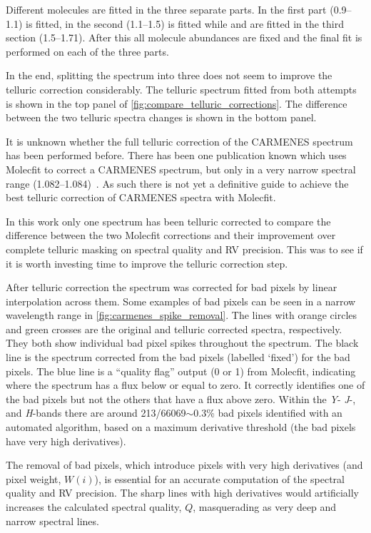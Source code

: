 Different molecules are fitted in the three separate parts.
In the first part (0.9--1.1\um{})  is fitted, in the second (1.1--1.5\um{})  is fitted while  and  are fitted in the third section (1.5--1.71\um{}).
After this all molecule abundances are fixed and the final fit is performed on each of the three parts.

In the end, splitting the spectrum into three does not seem to improve the telluric correction considerably.
The telluric spectrum fitted from both attempts is shown in the top panel of \cref{fig:compare_telluric_corrections}.
The difference between the two telluric spectra changes is shown in the bottom panel.

It is unknown whether the full telluric correction of the {CARMENES} \nir{} spectrum has been performed before.
There has been one publication known which uses {Molecfit} to correct a {CARMENES} spectrum, but only in a very narrow spectral range (1.082--1.084\um{})~\citep{allart_spectrally_2018}.
As such there is not yet a definitive guide to achieve the best telluric correction of {CARMENES} spectra with {Molecfit}.

In this work only one spectrum has been telluric corrected to compare the difference between the two {Molecfit} corrections and their improvement over complete telluric masking on spectral quality and {RV} precision.
This was to see if it is worth investing time to improve the telluric correction step.

After telluric correction the spectrum was corrected for bad pixels by linear interpolation across them.
Some examples of bad pixels can be seen in a narrow wavelength range in \cref{fig:carmenes_spike_removal}.
The lines with orange circles and green crosses are the original and telluric corrected spectra, respectively.
They both show individual bad pixel spikes throughout the spectrum.
The black line is the spectrum corrected from the bad pixels (labelled `fixed') for the bad pixels. 
The blue line is a ``quality flag'' output (0 or 1) from {Molecfit}, indicating where the spectrum has a flux below or equal to zero.
It correctly identifies one of the bad pixels but not the others that have a flux above zero.
Within the \emph{Y}- \emph{J}-, and \emph{H}-bands there are around 213/66069\(\sim\)0.3\% bad pixels identified with an automated algorithm, based on a maximum derivative threshold (the bad pixels have very high derivatives).

The removal of bad pixels, which introduce pixels with very high derivatives (and pixel weight, $W(i)$), is essential for an accurate computation of the spectral quality and RV precision.
The sharp lines with high derivatives would artificially increases the calculated spectral quality, \(Q\), masquerading as very deep and narrow spectral lines.

